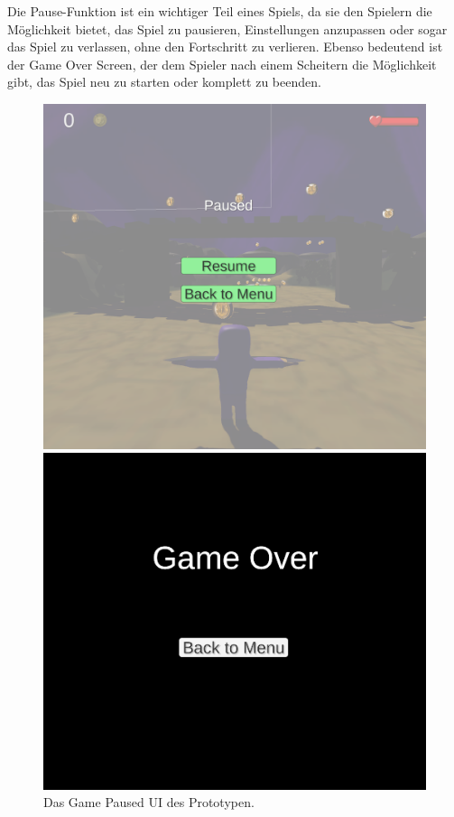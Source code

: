 Die Pause-Funktion ist ein wichtiger Teil eines Spiels, da sie den Spielern die Möglichkeit bietet, das Spiel zu pausieren, Einstellungen anzupassen oder sogar das Spiel zu verlassen, ohne den Fortschritt zu verlieren. Ebenso bedeutend ist der Game Over Screen, der dem Spieler nach einem Scheitern die Möglichkeit gibt, das Spiel neu zu starten oder komplett zu beenden.

\begin{figure}[H]
    \centering
    \begin{minipage}{0.4\textwidth}
        \centering
        \includegraphics[width=\linewidth]{chapters/03/images/GamePaused.png}
        \caption{Das Game Paused UI des Prototypen.}
        \label{UI01}
    \end{minipage}
    \hspace{1cm}
    \begin{minipage}{0.4\textwidth}
        \centering
        \includegraphics[width=\linewidth]{chapters/03/images/GameOver.png}

\end{minipage}
\end{figure}
